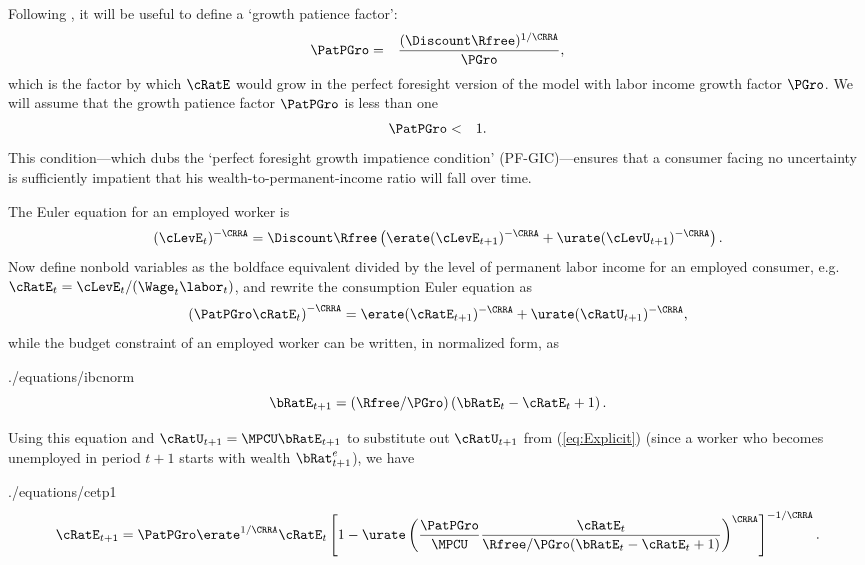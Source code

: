 \documentclass[titlepage]{\econtex}\newcommand{\texname}{cjSOE}
\begin{document}
Following \cite{BufferStockTheory}, it will be useful to define a `growth patience factor':
\begin{eqnarray}
  \PatPGro & = & \frac{(\Discount \Rfree)^{1/\CRRA}}{\PGro},
  \label{eq:PatPGro}
\end{eqnarray}
which is the factor by which $\cRatE$ would grow in the
perfect foresight version of the model with labor income growth factor
$\PGro$.  We will assume that the growth patience factor $\PatPGro$ is less than one
\begin{eqnarray}
\PatPGro & < & 1.
\label{eq:GIC}
\end{eqnarray}
This condition---which \cite{BufferStockTheory} dubs the `perfect foresight growth impatience condition' (PF-GIC)---ensures that a
consumer facing no uncertainty is sufficiently impatient that his
wealth-to-permanent-income ratio will fall over time.

The Euler equation for an employed worker is
\begin{equation*}
(\cLevE_t)^{-\CRRA} = \Discount \Rfree \left(\erate(\cLevE_{t+1})^{-\CRRA}+\urate (\cLevU_{t+1})^{-\CRRA} \right).
\end{equation*}
Now define nonbold variables as the boldface equivalent divided
by the level of permanent labor income for an employed consumer, e.g.\ $\cRatE_{t}=\cLevE_{t}/(\Wage_{t}\labor_{t})$, and rewrite the
consumption Euler equation as
\begin{equation}
\left( \PatPGro \cRatE_t \right)^{-\CRRA}= \erate (\cRatE_{t+1})^{-\CRRA}+\urate (\cRatU_{t+1})^{-\CRRA}
  \label{eq:Explicit},
\end{equation}
while the budget constraint of an employed worker can be written, in normalized form, as
\begin{verbatimwrite}{./equations/ibcnorm}
\begin{equation}
\bRatE_{t+1} = (\Rfree/\PGro)\left(\bRatE_{t} -\cRatE_{t}+1\right).
\label{eq:ibcnorm}
\end{equation}
\end{verbatimwrite}


Using this equation and $\cRatU_{t+1} = \MPCU \bRatE_{t+1}$ to substitute out $\cRatU_{t+1}$ from (\ref{eq:Explicit}) (since a worker who becomes unemployed in period $t+1$ starts with wealth $\bRat^e_{t+1}$), we have
\begin{verbatimwrite}{./equations/cetp1}
\begin{equation}
\cRatE_{t+1}=\PatPGro \erate^{1/\CRRA} \cRatE_t
\left[1-\urate\left(\frac{\PatPGro}{\MPCU} \frac{\cRatE_t}{\Rfree/\PGro(\bRatE_{t} -\cRatE_{t}+1)}\right)^{\CRRA}\right]^{-1/\CRRA}.
\label{eq:cetp1}
\end{equation}
\end{verbatimwrite}

\end{document}
